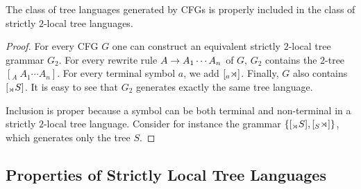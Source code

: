 \begin{theorem}
    The class of tree languages generated by CFGs is properly included in the class of strictly $2$-local tree languages.
\end{theorem}
%
\begin{proof}
    For every CFG $G$ one can construct an equivalent strictly $2$-local tree grammar $G_2$.
    For every rewrite rule $A \rightarrow A_1 \cdots A_n$ of $G$, $G_2$ contains the $2$-tree $[_A\ A_1 \cdots A_n]$.
    For every terminal symbol $a$, we add $[_a \rtimes ]$.
    Finally, $G$ also contains $[_{\rtimes} S]$.
    It is easy to see that $G_2$ generates exactly the same tree language.

    Inclusion is proper because a symbol can be both terminal and non-terminal in a strictly $2$-local tree language.
    Consider for instance the grammar $\left \{ [_{\rtimes} S], [_S \rtimes] \right \}$, which generates only the tree $S$.
\end{proof}

\subsection{Properties of Strictly Local Tree Languages}

